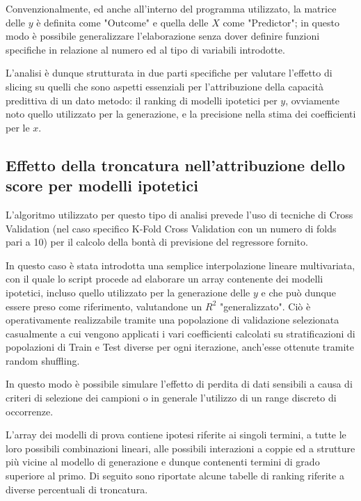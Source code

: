 \documentclass[12pt,openright,twoside,a4paper]{book}
\begin{document}
Convenzionalmente, ed anche all'interno del programma utilizzato, la matrice delle $y$ è definita come "Outcome" e quella delle $X$ come "Predictor"; in questo modo è possibile generalizzare l'elaborazione senza dover definire funzioni specifiche in relazione al numero ed al tipo di variabili introdotte.

L'analisi è dunque strutturata in due parti specifiche per valutare l'effetto di slicing su quelli che sono aspetti essenziali per l'attribuzione della capacità predittiva di un dato metodo: il ranking di modelli ipotetici per $y$, ovviamente noto quello utilizzato per la generazione, e la precisione nella stima dei coefficienti per  le $x$.

\subsection{Effetto della troncatura nell'attribuzione dello score per modelli ipotetici}
L'algoritmo utilizzato per questo tipo di analisi prevede l'uso di tecniche di Cross Validation (nel caso specifico K-Fold Cross Validation con un numero di folds pari a 10) per il calcolo della bontà di previsione del regressore fornito.
 
In questo caso è stata introdotta una semplice interpolazione lineare multivariata, con il quale lo script procede ad elaborare un array contenente dei modelli ipotetici, incluso quello utilizzato per la generazione delle $y$ e che può dunque essere preso come riferimento, valutandone un $R^2$ "generalizzato".
Ciò è operativamente realizzabile tramite una popolazione di validazione selezionata casualmente a cui vengono applicati i vari coefficienti calcolati su stratificazioni di popolazioni di Train e Test diverse per ogni iterazione, anch'esse ottenute tramite random shuffling.

In questo modo è possibile simulare l'effetto di perdita di dati sensibili a causa di criteri di selezione dei campioni o in generale l'utilizzo di un range discreto di occorrenze.

L'array dei modelli di prova contiene ipotesi riferite ai singoli termini, a tutte le loro possibili combinazioni lineari, alle possibili interazioni a coppie ed a strutture più vicine al modello di generazione e dunque contenenti termini di grado superiore al primo.
Di seguito sono riportate alcune tabelle di ranking riferite a diverse percentuali di troncatura.
\end{document}

